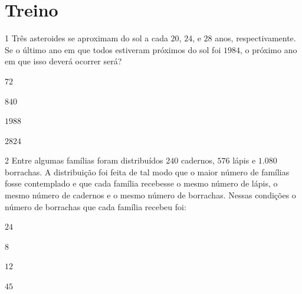 
\section{Treino}

\num{1}  Três asteroides se aproximam do sol a cada $20$, $24$, e $28$ anos,
respectivamente. Se o último ano em que todos estiveram próximos do sol
foi $1984$, o próximo ano em que isso deverá ocorrer será?

\begin{escolha}
\item
  $72$
\item
  $840$
\item
  $1988$
\item
  $2824$
\end{escolha}



\num{2}  Entre algumas famílias foram distribuídos $240$ cadernos, $576$ lápis e
$1.080$ borrachas. A distribuição foi feita de tal modo que o maior número
de famílias fosse contemplado e que cada família recebesse o mesmo
número de lápis, o mesmo número de cadernos e o mesmo número de
borrachas. Nessas condições o número de borrachas que cada família
recebeu foi:

\begin{escolha}
\item $24$ 
\item $8$ 
\item $12$ 
\item $45$
\end{escolha}

